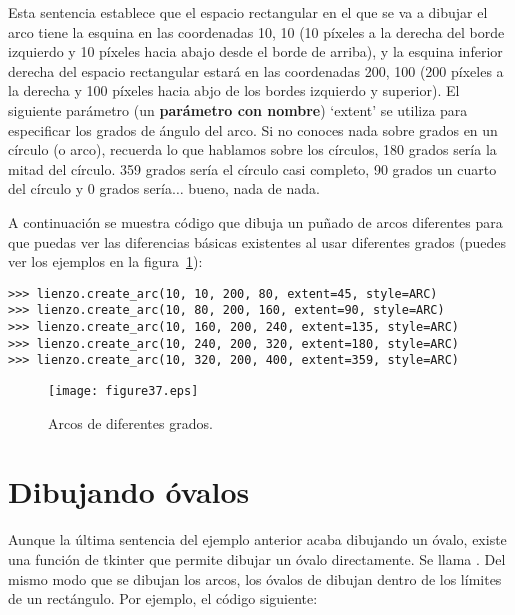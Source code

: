 Esta sentencia establece que el espacio rectangular en el que se va a dibujar el arco tiene la esquina en las coordenadas 10, 10 (10 píxeles a la derecha del borde izquierdo y 10 píxeles hacia abajo desde el borde de arriba), y la esquina inferior derecha del espacio rectangular estará en las coordenadas 200, 100 (200 píxeles a la derecha y 100 píxeles hacia abjo de los bordes izquierdo y superior).  El siguiente parámetro (un \textbf{parámetro con nombre}) `extent' se utiliza para especificar los grados de ángulo del arco.  Si no conoces nada sobre grados en un círculo (o arco), recuerda lo que hablamos sobre los círculos, 180 grados sería la mitad del círculo.  359 grados sería el círculo casi completo, 90 grados un cuarto del círculo y 0 grados sería$\ldots$ bueno, nada de nada. 

A continuación se muestra código que dibuja un puñado de arcos diferentes para que puedas ver las diferencias básicas existentes al usar diferentes grados (puedes ver los ejemplos en la figura~\ref{fig37}):

\begin{listing}
\begin{verbatim}
>>> lienzo.create_arc(10, 10, 200, 80, extent=45, style=ARC)
>>> lienzo.create_arc(10, 80, 200, 160, extent=90, style=ARC)
>>> lienzo.create_arc(10, 160, 200, 240, extent=135, style=ARC)
>>> lienzo.create_arc(10, 240, 200, 320, extent=180, style=ARC)
>>> lienzo.create_arc(10, 320, 200, 400, extent=359, style=ARC)
\end{verbatim}
\end{listing}

\begin{figure}
\begin{center}
\texttt{[image: figure37.eps]}
\end{center}
\caption{Arcos de diferentes grados.}\label{fig37}
\end{figure}

\section{Dibujando óvalos}

Aunque la última sentencia del ejemplo anterior acaba dibujando un óvalo, existe una función de tkinter que permite dibujar un óvalo directamente. Se llama  .  Del mismo modo que se dibujan los arcos, los óvalos de dibujan dentro de los límites de un rectángulo.  Por ejemplo, el código siguiente:

